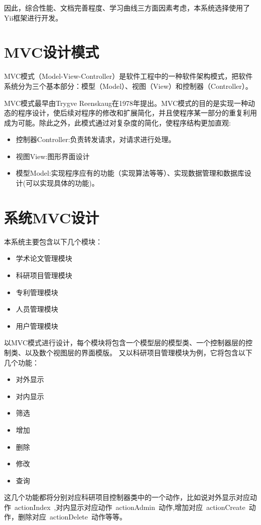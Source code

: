 因此，综合性能、文档完善程度、学习曲线三方面因素考虑，本系统选择使用了Yii框架进行开发。

\section{MVC设计模式}

MVC模式（Model-View-Controller）是软件工程中的一种软件架构模式，把软件系统分为三个基本部分：模型（Model）、视图（View）和控制器（Controller）。

MVC模式最早由Trygve Reenskaug在1978年提出。MVC模式的目的是实现一种动态的程序设计，使后续对程序的修改和扩展简化，并且使程序某一部分的重复利用成为可能。除此之外，此模式通过对复杂度的简化，使程序结构更加直观:
\begin{itemize}
\item 控制器Controller:负责转发请求，对请求进行处理。
\item 视图View:图形界面设计
\item 模型Model:实现程序应有的功能（实现算法等等）、实现数据管理和数据库设计(可以实现具体的功能)。
\end{itemize}


\section{系统MVC设计}
本系统主要包含以下几个模块：
\begin{itemize}
\item 学术论文管理模块
\item 科研项目管理模块
\item 专利管理模块
\item 人员管理模块
\item 用户管理模块
\end{itemize}

以MVC模式进行设计，每个模块将包含一个模型层的模型类、一个控制器层的控制类、以及数个视图层的界面模版。
又以科研项目管理模块为例，它将包含以下几个功能：

\begin{itemize}
\item 对外显示
\item 对内显示
\item 筛选
\item 增加
\item 删除
\item 修改
\item 查询
\end{itemize}
这几个功能都将分别对应科研项目控制器类中的一个动作，比如说对外显示对应动作~actionIndex~,对内显示对应动作~actionAdmin~动作,增加对应~actionCreate~动作，删除对应~actionDelete~动作等等。

